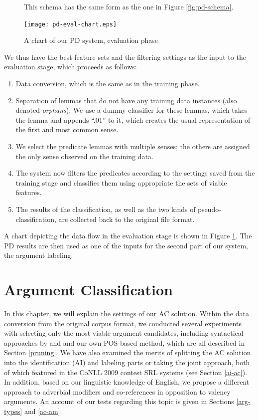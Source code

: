 \documentclass[12pt,notitlepage]{report}
\begin{document}
\begin{figure}[htb]
\caption{A chart of our PD system, evaluation phase}\label{fig:pd-eval}
\noindent\footnotesize This schema has the same form as the one in Figure \ref{fig:pd-schema}.
\begin{center}
\texttt{[image: pd-eval-chart.eps]}
\end{center}
\end{figure}

We thus have the best feature sets and the filtering settings as the input to the evaluation stage, which proceeds as follows:
\begin{enumerate}
    \item Data conversion, which is the same as in the training phase.
    \item Separation of lemmas that do not have any training data instances (also denoted \emph{orphans}). We use a dummy classifier for these lemmas, which takes the lemma and appends ``.01'' to it, which creates the usual representation of the first and most common sense.
    \item We select the predicate lemmas with multiple senses; the others are assigned the only sense observed on the training data.
    \item The system now filters the predicates according to the settings saved from the training stage and classifies them using appropriate the sets of viable features.
    \item The results of the classification, as well as the two kinds of pseudo-classification, are collected back to the original file format.
\end{enumerate}
A chart depicting the data flow in the evaluation stage is shown in Figure \ref{fig:pd-eval}. The PD results are then used as one of the inputs for the second part of our system, the argument labeling.

%
%
\chapter{Argument Classification}\label{ac}
%
%

In this chapter, we will explain the settings of our AC solution. Within the data conversion from the original corpus format, we conducted several experiments with selecting only the most viable argument candidates, including syntactical approaches by \citet{zha09} and \citet{asahara09} and our own POS-based method, which are all described in Section \ref{pruning}. We have also examined the merits of splitting the AC solution into the identification (AI) and labeling parts or taking the joint approach, both of which featured in the CoNLL 2009 contest SRL systems (see Section \ref{ai-ac}). In addition, based on our linguistic knowledge of English, we propose a different approach to adverbial modifiers and co-references in opposition to valency arguments. An account of our tests regarding this topic is given in Sections \ref{arg-types} and \ref{ac-am}. 
\end{document}

